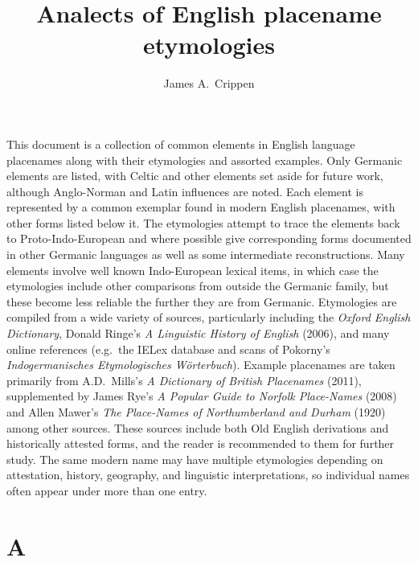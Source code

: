 \documentclass[12pt,letterpaper,oneside,article,draft]{memoir}
\begin{document}
\pagestyle{mine}

\title{Analects of English placename etymologies}
\author{James A.~Crippen}

\maketitle

\raggedyright

This document is a collection of common elements in English language placenames along with their etymologies and assorted examples. Only Germanic elements are listed, with Celtic and other elements set aside for future work, although Anglo-Norman and Latin influences are noted. Each element is represented by a common exemplar found in modern English placenames, with other forms listed below it. The etymologies attempt to trace the elements back to Proto-Indo-European and where possible give corresponding forms documented in other Germanic languages as well as some intermediate reconstructions. Many elements involve well known Indo-European lexical items, in which case the etymologies include other comparisons from outside the Germanic family, but these become less reliable the further they are from Germanic. Etymologies are compiled from a wide variety of sources, particularly including the \textit{Oxford English Dictionary}, Donald Ringe’s \textit{A Linguistic History of English} (2006), and many online references (e.g.\ the IELex database and scans of Pokorny’s \textit{Indogermanisches Etymologisches Wörterbuch}). Example placenames are taken primarily from A.D.~Mills’s \textit{A Dictionary of British Placenames} (2011), supplemented by James Rye’s \textit{A Popular Guide to Norfolk Place-Names} (2008) and Allen Mawer’s \textit{The Place-Names of Northumberland and Durham} (1920) among other sources. These sources include both Old English derivations and historically attested forms, and the reader is recommended to them for further study. The same modern name may have multiple etymologies depending on attestation, history, geography, and linguistic interpretations, so individual names often appear under more than one entry.

\clearpage
\section*{A}
\end{document}
